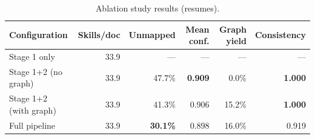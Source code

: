 \begin{table}[htbp]
  \centering
  \caption{Ablation study results (resumes).}
  \label{tab:ablation-res}
  \begin{tabular}{lrrrrr}
    \toprule
    Configuration & Skills/doc & Unmapped & Mean conf. & Graph yield & Consistency \\
    \midrule
  Stage 1 only & 33.9 & --- & --- & --- & --- \\
  Stage 1+2 (no graph) & 33.9 & 47.7\% & \textbf{0.909} & 0.0\% & \textbf{1.000} \\
  Stage 1+2 (with graph) & 33.9 & 41.3\% & 0.906 & 15.2\% & \textbf{1.000} \\
  Full pipeline & 33.9 & \textbf{30.1\%} & 0.898 & 16.0\% & 0.919 \\
    \bottomrule
  \end{tabular}
\end{table}